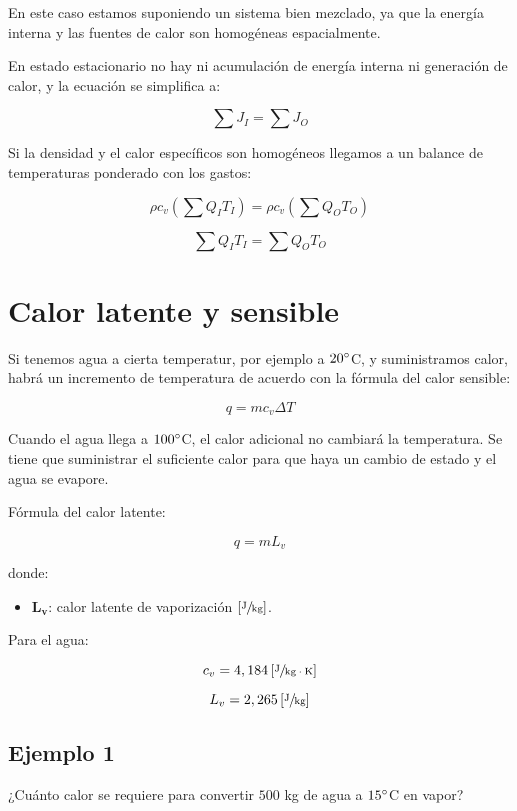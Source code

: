 \documentclass[11pt]{article}
\begin{document}
En este caso estamos suponiendo un sistema bien mezclado, ya que la energía interna y las fuentes de calor son homogéneas espacialmente.

En estado estacionario no hay ni acumulación de energía interna ni generación de calor, y la ecuación se simplifica a:

\[ \sum J_I = \sum J_O \]

Si la densidad y el calor específicos son homogéneos llegamos a un balance de temperaturas ponderado con los gastos:

\[ \rho c_v \left( \sum Q_I T_I \right) = \rho c_v \left( \sum Q_O T_O \right) \]

\[ \boxed{ \sum Q_I T_I = \sum Q_O T_O } \]

\section{Calor latente y sensible}

Si tenemos agua a cierta temperatur, por ejemplo a \( 20 \degree \)C, y suministramos calor, habrá un incremento de temperatura de acuerdo con la fórmula del calor sensible:

\[ \boxed{ q = m c_v \Delta T } \]

Cuando el agua llega a \( 100 \degree \)C, el calor adicional no cambiará la temperatura. Se tiene que suministrar el suficiente calor para que haya un cambio de estado y el agua se evapore.

Fórmula del calor latente:

\[ \boxed{ q = m L_v } \]

donde:

\begin{itemize}
    \item \( \mathbf{ L_v } \): calor latente de vaporización \( \left[ \sfrac{\text{J}}{\text{kg}} \right] \).
\end{itemize}

Para el agua:

\[ c_v = 4,184 \left[ \sfrac{\text{J}}{\text{kg} \cdot \text{K}} \right] \]

\[ L_v = 2,265 \left[ \sfrac{\text{J}}{\text{kg}} \right] \]

\subsection{Ejemplo 1}

¿Cuánto calor se requiere para convertir \( 500 \) kg de agua a \( 15 \degree \)C en vapor?
\end{document}
